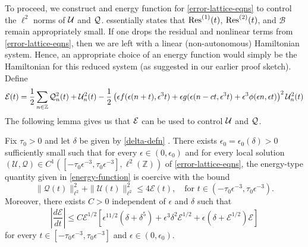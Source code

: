 To proceed, we construct and energy function for \cref{error-lattice-eqns} to control the \(\ell^2\) norms of \(\mathcal{U}\) and \(\mathcal{Q}\).  essentially states that \(\mathrm{Res}^{(1)}(t)\), \(\mathrm{Res}^{(2)}(t)\), and \(\mathcal B\) remain appropriately small. If one drops the residual and nonlinear terms from \cref{error-lattice-eqns}, then we are left with a linear (non-autonomous) Hamiltonian system. Hence, an appropriate choice of an energy function would simply be the Hamiltonian for this reduced system (as suggested in our earlier proof sketch). Define 
\begin{equation}\label{energy-function}
	\mathcal{E}(t) = \frac 1 2 \sum_{n\in \mathbb Z} \mathcal Q_n^2(t) + \mathcal U_n^2(t) - \frac 1 2 \left(\epsilon f(\epsilon(n+t), \epsilon^3 t) + \epsilon g(\epsilon(n-ct, \epsilon^3t) + \epsilon^3 \phi(\epsilon n, \epsilon t)\right)^2 \mathcal U_n^2(t)
\end{equation}
The following lemma gives us that \(\mathcal{E}\) can be used to control \(\mathcal{U}\) and \(\mathcal{Q}\).
\begin{lem}\label{energy-coercive-bounds-lem}
	Fix \(\tau_0>0 \) and let \(\delta\) be given by \cref{delta-defn} . There exists \(\epsilon_0 = \epsilon_0(\delta) >0\) sufficiently small such that for every \(\epsilon \in (0,\epsilon_0)\) and for every local solution \((\mathcal U, \mathcal Q) \in C^1([-\tau_0\epsilon^{-3}, \tau_0\epsilon^{-3}], \ell^2(\mathbb Z))\) of \cref{error-lattice-eqns}, the energy-type quantity given in \cref{energy-function} is coercive with the bound
	\begin{equation}\label{coercive-bound}
		\|\mathcal Q(t) \|_{\ell^2}^2 + \| \mathcal U (t) \|_{\ell^2}^2 \leq  4 \mathcal E(t), \quad \text{for } t\in(-\tau_0\epsilon^{-3}, \tau_0\epsilon^{-3}).
	\end{equation}
	Moreover, there exists \(C> 0\) independent of \(\epsilon\) and \(\delta\) such that 
	\begin{equation}
		\left|\frac{d\mathcal E}{dt} \right| \leq C \mathcal E^{1/2}\left[ \epsilon^{11/2} (\delta + \delta^5)  + \epsilon^3\delta^2\mathcal E^{1/2} + \epsilon(\delta + \mathcal{E}^{1/2})\mathcal E\right]
	\end{equation}
	for every \(t\in [-\tau_0\epsilon^{-3}, \tau_0\epsilon^{-3}]\) and \(\epsilon \in (0,\epsilon_0)\). 	  
\end{lem}
